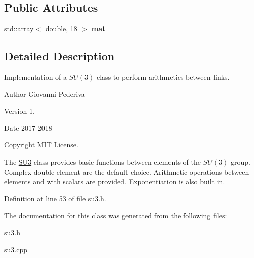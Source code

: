 \subsection*{Public Attributes}
\begin{DoxyCompactItemize}
\item 
std\+::array$<$ double, 18 $>$ {\bfseries mat}\hypertarget{structSU3_acf8e4278a5ad59ae35c0c6cbc1e81685}{}\label{structSU3_acf8e4278a5ad59ae35c0c6cbc1e81685}

\end{DoxyCompactItemize}


\subsection{Detailed Description}
Implementation of a $SU(3)$ class to perform arithmetics between links. 

\begin{DoxyAuthor}{Author}
Giovanni Pederiva 
\end{DoxyAuthor}
\begin{DoxyVersion}{Version}
1. 
\end{DoxyVersion}
\begin{DoxyDate}{Date}
2017-\/2018 
\end{DoxyDate}
\begin{DoxyCopyright}{Copyright}
M\+IT License.
\end{DoxyCopyright}
The \hyperlink{structSU3}{S\+U3} class provides basic functions between elements of the $SU(3)$ group. Complex double element are the default choice. Arithmetic operations between elements and with scalars are provided. Exponentiation is also built in. 

Definition at line 53 of file su3.\+h.



The documentation for this class was generated from the following files\+:\begin{DoxyCompactItemize}
\item 
\hyperlink{su3_8h}{su3.\+h}\item 
\hyperlink{su3_8cpp}{su3.\+cpp}\end{DoxyCompactItemize}
